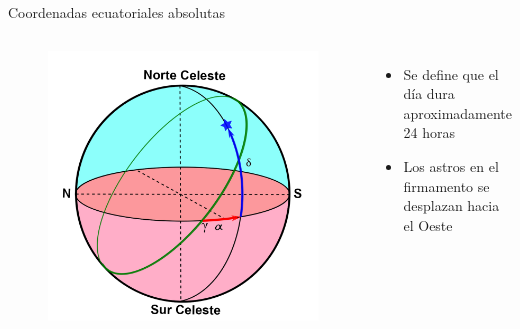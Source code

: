 \documentclass{beamer}
\begin{document}
\begin{frame}{Coordenadas ecuatoriales absolutas}
 \begin{columns}
  \begin{figure}
   \centering
   \includegraphics[scale=0.14]{Imagenes/C_Ecua_Abs_01}
  \end{figure}
 \small
 \justify
\begin{itemize}
\item Se define que el día dura aproximadamente 24 horas
\item Los astros en el firmamento se desplazan hacia el Oeste
\end{itemize}
 \end{columns}
\end{frame}
\end{document}

